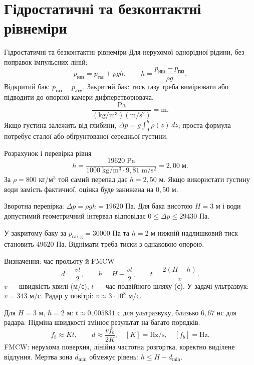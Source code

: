 \documentclass[aspectratio=169,11pt]{beamer}
\begin{document}
\section{Гідростатичні та безконтактні рівнеміри}
\begin{frame}{Гідростатичні та безконтактні рівнеміри}
Для нерухомої однорідної рідини, без поправок імпульсних ліній:
\[
 p_{\mathrm{низ}}=p_{\mathrm{газ}}+\rho gh,\qquad h=\frac{p_{\mathrm{низ}}-p_{\mathrm{газ}}}{\rho g}.
\]
Відкритий бак: $p_{\mathrm{газ}}=p_{\mathrm{атм}}$. Закритий бак: тиск газу треба вимірювати або підводити до опорної камери дифперетворювача.
\[
 \frac{\mathrm{Pa}}{(\mathrm{kg/m^3})(\mathrm{m/s^2})}=\mathrm{m}.
\]
Якщо густина залежить від глибини, $\Delta p=g\int_0^h\rho(z)\,dz$; проста формула потребує сталої або обґрунтованої середньої густини.
\end{frame}
\begin{frame}{Розрахунок і перевірка рівня}
\[
 h=\frac{19620\;\mathrm{Pa}}{1000\;\mathrm{kg/m^3}\cdot9{,}81\;\mathrm{m/s^2}}=2{,}00\;\mathrm{м}.
\]
За $\rho=800$ кг/м$^3$ той самий перепад дає $h=2{,}50$ м. Якщо використати густину води замість фактичної, оцінка буде занижена на $0{,}50$ м.

Зворотна перевірка: $\Delta p=\rho gh=19620$ Па. Для бака висотою $H=3$ м і води допустимий геометричний інтервал відповідає $0\le\Delta p\le29430$ Па.

У закритому баку за $p_{\mathrm{газ,g}}=30000$ Па та $h=2$ м нижній надлишковий тиск становить $49620$ Па. Віднімати треба тиски з однаковою опорою.
\end{frame}
\begin{frame}{Визначення: час прольоту й FMCW}
\[
 d=\frac{vt}{2},\qquad h=H-\frac{vt}{2},\qquad t=\frac{2(H-h)}v.
\]
$v$ --- швидкість хвилі (м/с), $t$ --- час подвійного шляху (с). У задачі ультразвук: $v=343$ м/с. Радар у повітрі: $v\approx3\cdot10^8$ м/с.

Для $H=3$ м, $h=2$ м: $t\approx0{,}005831$ с для ультразвуку, близько $6{,}67$ нс для радара. Підміна швидкості змінює результат на багато порядків.
\[
 f_b\approx Kt,\qquad d\approx\frac{vf_b}{2K},\quad [K]=\mathrm{Hz/s},\quad [f_b]=\mathrm{Hz}.
\]
FMCW: нерухома поверхня, лінійна частотна розгортка, коректно виділене відлуння. Мертва зона $d_{\min}$ обмежує рівень: $h\le H-d_{\min}$.
\end{frame}
\end{document}
